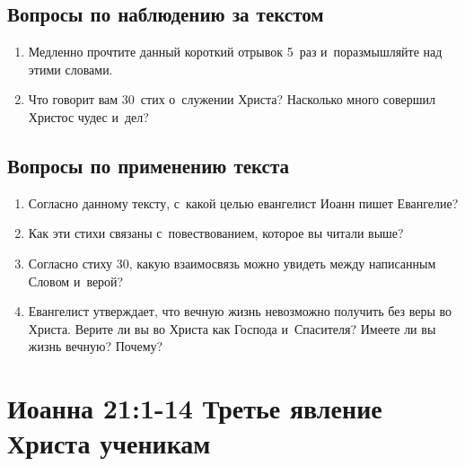 \documentclass[a4paper,12pt]{article}
\begin{document}
\subsection*{Вопросы по наблюдению за текстом}
\begin{enumerate}
    \item Медленно прочтите данный короткий отрывок 5~раз и~поразмышляйте над этими словами. 
    
    \myline
    
    \myline
    \item Что говорит вам 30~стих о~служении Христа? Насколько много совершил Христос чудес и~дел?
    
    \myline
    
    \myline
\end{enumerate}

\subsection*{Вопросы по применению текста} 
\begin{enumerate}
    \item Согласно данному тексту, с~какой целью евангелист Иоанн пишет Евангелие? 
    
    \myline
    
    \myline
    \item Как эти стихи связаны с~повествованием, которое вы читали выше?
    
    \myline
    
    \myline
    \item Согласно стиху 30, какую взаимосвязь можно увидеть между написанным Словом и~верой? 
    
    \myline
    
    \myline

    \item Евангелист утверждает, что вечную жизнь невозможно получить без веры во Христа. Верите ли вы во Христа как Господа и~Спасителя? Имеете ли вы жизнь вечную? Почему? 
    
    \myline
    
    \myline
\end{enumerate}



\section{Иоанна 21:1-14 Третье явление Христа ученикам}
\end{document}
